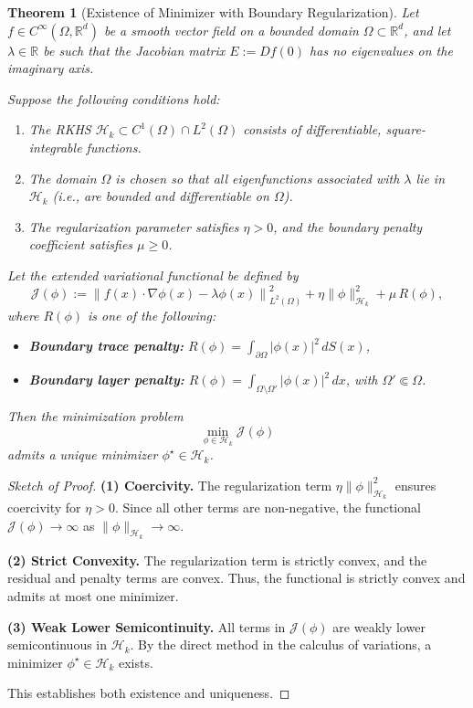 \documentclass[11pt]{article}
\theoremstyle{plain}
\newtheorem{theorem}{Theorem}[section]
\def\[{\begin{equation}}
\def\]{\end{equation}}
\begin{document}
\begin{theorem}[Existence of Minimizer with Boundary Regularization]
Let $f \in C^\infty(\Omega, \mathbb{R}^d)$ be a smooth vector field on a bounded domain $\Omega \subset \mathbb{R}^d$, and let $\lambda \in \mathbb{R}$ be such that the Jacobian matrix $E := Df(0)$ has no eigenvalues on the imaginary axis.

Suppose the following conditions hold:
\begin{enumerate}
    \item The RKHS $\mathcal{H}_k \subset C^1(\Omega) \cap L^2(\Omega)$ consists of differentiable, square-integrable functions.
    \item The domain $\Omega$ is chosen so that all eigenfunctions associated with $\lambda$ lie in $\mathcal{H}_k$ (i.e., are bounded and differentiable on $\Omega$).
    \item The regularization parameter satisfies $\eta > 0$, and the boundary penalty coefficient satisfies $\mu \geq 0$.
\end{enumerate}

Let the extended variational functional be defined by
\[
\mathcal{J}(\phi) := \left\| f(x) \cdot \nabla \phi(x) - \lambda \phi(x) \right\|_{L^2(\Omega)}^2 + \eta \|\phi\|_{\mathcal{H}_k}^2 + \mu \, R(\phi),
\]
where \( R(\phi) \) is one of the following:
\begin{itemize}
    \item \textbf{Boundary trace penalty:} \( R(\phi) = \int_{\partial \Omega} |\phi(x)|^2 \, dS(x) \),
    \item \textbf{Boundary layer penalty:} \( R(\phi) = \int_{\Omega \setminus \Omega'} |\phi(x)|^2 \, dx \), with \( \Omega' \Subset \Omega \).
\end{itemize}

Then the minimization problem
\[
\min_{\phi \in \mathcal{H}_k} \mathcal{J}(\phi)
\]
admits a unique minimizer \( \phi^\star \in \mathcal{H}_k \).
\end{theorem}

\begin{proof}[Sketch of Proof]
\textbf{(1) Coercivity.} The regularization term \( \eta \|\phi\|_{\mathcal{H}_k}^2 \) ensures coercivity for \( \eta > 0 \). Since all other terms are non-negative, the functional \( \mathcal{J}(\phi) \to \infty \) as \( \|\phi\|_{\mathcal{H}_k} \to \infty \).

\textbf{(2) Strict Convexity.} The regularization term is strictly convex, and the residual and penalty terms are convex. Thus, the functional is strictly convex and admits at most one minimizer.

\textbf{(3) Weak Lower Semicontinuity.} All terms in \( \mathcal{J}(\phi) \) are weakly lower semicontinuous in \( \mathcal{H}_k \). By the direct method in the calculus of variations, a minimizer \( \phi^\star \in \mathcal{H}_k \) exists.

This establishes both existence and uniqueness.
\end{proof}
\end{document}

